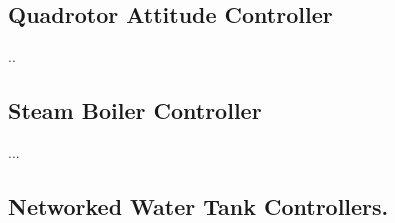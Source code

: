 



\subsection{Quadrotor Attitude Controller}
\label{sec:quadrotor}
..




\subsection{Steam Boiler Controller}

...

\subsection{Networked Water Tank Controllers.}


